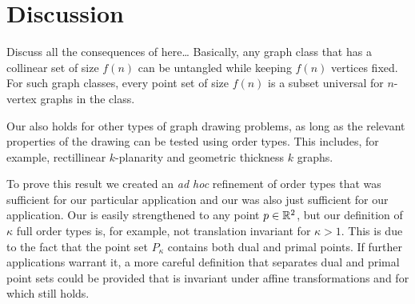 \documentclass{patmorin}
\begin{document}
\section{Discussion}

Discuss all the consequences of  here\ldots
Basically, any graph class that has a collinear set of size $f(n)$ can 
be untangled while keeping $f(n)$ vertices fixed.  For such graph classes,
every point set of size $f(n)$ is a subset universal for $n$-vertex graphs
in the class.

Our  also holds for other types of graph drawing problems,
as long as the relevant properties of the drawing can be tested using
order types.  This includes, for example, rectillinear $k$-planarity
and geometric thickness $k$ graphs.

To prove this result we created an \emph{ad hoc} refinement of order types
that was sufficient for our particular application and our 
was also just sufficient for our application.  Our  is easily
strengthened to any point $p\in\mathbb{R}^2$, but our definition of $\kappa$
full order types is, for example, not translation invariant for $\kappa
> 1$. This is due to the fact that the point set $P_{\kappa}$ contains
both dual and primal points.  If further applications warrant it, a more
careful definition that separates dual and primal point sets could be
provided that is invariant under affine transformations and for which
 still holds.
\end{document}

